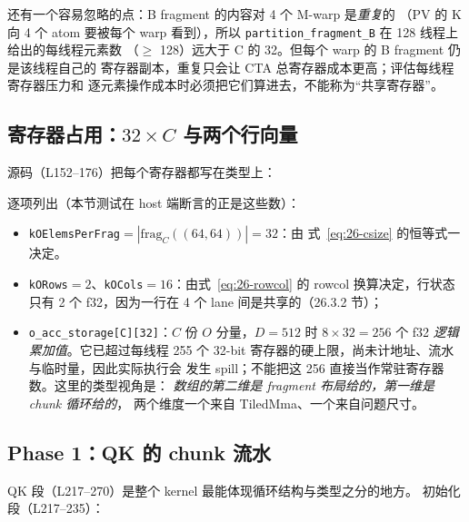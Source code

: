 还有一个容易忽略的点：B fragment 的内容对 4 个 M-warp 是\emph{重复}的
（PV 的 K 向 4 个 atom 要被每个 warp 看到），所以
\texttt{partition\_\allowbreak{}fragment\_\allowbreak{}B} 在 128 线程上给出的每线程元素数
（$\ge$ 128）远大于 C 的 32。但每个 warp 的 B fragment 仍是该线程自己的
寄存器副本，重复只会让 CTA 总寄存器成本更高；评估每线程寄存器压力和
逐元素操作成本时必须把它们算进去，不能称为“共享寄存器”。

\subsection{寄存器占用：$32\times C$ 与两个行向量}

源码（L152--176）把每个寄存器都写在类型上：



逐项列出（本节测试在 host 端断言的正是这些数）：

\begin{itemize}[itemsep=2pt,topsep=2pt]
  \item \texttt{k\allowbreak{}OElems\allowbreak{}Per\allowbreak{}Frag}$=|\mathrm{frag}_C((64,64))| = 32$：由
        式~\eqref{eq:26-csize} 的恒等式一决定。
  \item \texttt{kORows}$=2$、\texttt{kOCols}$=16$：由式~\eqref{eq:26-rowcol}
        的 rowcol 换算决定，行状态只有 2 个 f32，因为一行在
        4 个 lane 间是共享的（26.3.2 节）；
  \item \texttt{o\_\allowbreak{}acc\_\allowbreak{}storage[C][32]}：$C$ 份 $O$ 分量，$D=512$ 时
        $8\times32=256$ 个 f32 \emph{逻辑累加值}。它已超过每线程 255 个
        32-bit 寄存器的硬上限，尚未计地址、流水与临时量，因此实际执行会
        发生 spill；不能把这 256 直接当作常驻寄存器数。这里的类型视角是：
        \emph{数组的第二维是 fragment 布局给的，第一维是 chunk 循环给的}，
        两个维度一个来自 TiledMma、一个来自问题尺寸。
\end{itemize}

\subsection{Phase 1：QK 的 chunk 流水}

QK 段（L217--270）是整个 kernel 最能体现循环结构与类型之分的地方。
初始化段（L217--235）：



